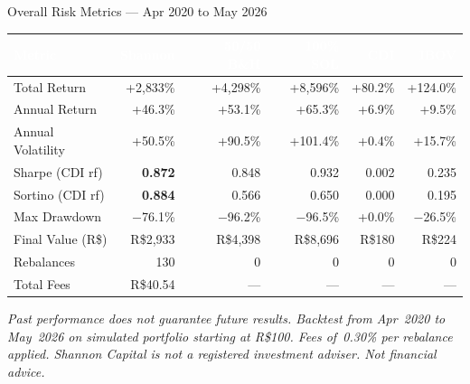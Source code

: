 \documentclass[aspectratio=169,10pt]{beamer}
\begin{document}
\begin{frame}{Overall Risk Metrics --- Apr 2020 to May 2026}
\vspace{0.2em}
\begin{center}
\footnotesize
\begin{tabular}{@{\hspace{0.3em}}l r r r r r@{\hspace{0.3em}}}
\toprule
\rowcolor{Navy}
  \textcolor{white}{\textbf{Metric}} &
  \textcolor{white}{\textbf{Shannon}} &
  \textcolor{white}{\textbf{50/50 B\&H}} &
  \textcolor{white}{\textbf{100\% SOL}} &
  \textcolor{white}{\textbf{CDI}} &
  \textcolor{white}{\textbf{IBOV}} \\
\midrule
Total Return      & \textcolor{Success}{+2{,}833\%}  & \textcolor{Success}{+4{,}298\%}  & \textcolor{Success}{+8{,}596\%}  & \textcolor{Success}{+80.2\%}  & \textcolor{Success}{+124.0\%} \\
Annual Return     & \textcolor{Success}{+46.3\%} & \textcolor{Success}{+53.1\%} & \textcolor{Success}{+65.3\%} & \textcolor{Success}{+6.9\%}  & \textcolor{Success}{+9.5\%}  \\
Annual Volatility & +50.5\% & +90.5\% & +101.4\% & +0.4\% & +15.7\% \\
Sharpe (CDI rf)   & \textbf{0.872} & 0.848 & 0.932 & 0.002 & 0.235 \\
Sortino (CDI rf)  & \textbf{0.884} & 0.566 & 0.650 & 0.000 & 0.195 \\
Max Drawdown      & \textcolor{Danger}{$-$76.1\%} & \textcolor{Danger}{$-$96.2\%} & \textcolor{Danger}{$-$96.5\%} & +0.0\% & \textcolor{Danger}{$-$26.5\%} \\
Final Value (R\$)  & R\$2{,}933 & R\$4{,}398 & R\$8{,}696 & R\$180 & R\$224 \\
Rebalances        & 130 & 0 & 0 & 0 & 0 \\
Total Fees        & R\$40.54 & --- & --- & --- & --- \\
\bottomrule
\end{tabular}
\end{center}
\vspace*{\fill}
{\scriptsize\color{MutedText}\itshape
Past performance does not guarantee future results. Backtest from Apr~2020 to May~2026
on simulated portfolio starting at R\$100. Fees of~0.30\% per rebalance applied.
Shannon Capital is not a registered investment adviser. Not financial advice.}
\end{frame}
\end{document}
